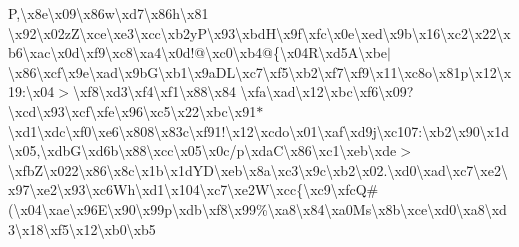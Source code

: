 \begin{DoxyCompactItemize}
P,\textbackslash{}x8e\textbackslash{}x09\textbackslash{}x86w\textbackslash{}xd7\textbackslash{}x86h\textbackslash{}x81 \textbackslash{}x92\textbackslash{}x02z\+Z\textbackslash{}xce\textbackslash{}xe3\textbackslash{}xcc\textbackslash{}xb2y\+P\textbackslash{}x93\textbackslash{}xbd\+H\textbackslash{}x9f\textbackslash{}xfc\textbackslash{}x0e\textbackslash{}xed\textbackslash{}x9b\textbackslash{}x16\textbackslash{}xc2\textbackslash{}x22\textbackslash{}xb6\textbackslash{}xac\textbackslash{}x0d\textbackslash{}xf9\textbackslash{}xc8\textbackslash{}xa4\textbackslash{}x0d!@\textbackslash{}xc0\textbackslash{}xb4@\{\textbackslash{}x04\+R\textbackslash{}xd5\+A\textbackslash{}xbe$\vert$\textbackslash{}x86\textbackslash{}xcf\textbackslash{}x9e\textbackslash{}xad\textbackslash{}x9b\+G\textbackslash{}xb1\textbackslash{}x9a\+D\+L\textbackslash{}xc7\textbackslash{}xf5\textbackslash{}xb2\textbackslash{}xf7\textbackslash{}xf9\textbackslash{}x11\textbackslash{}xc8o\textbackslash{}x81p\textbackslash{}x12\textbackslash{}x19\+:\textbackslash{}x04$>$\textbackslash{}xf8\textbackslash{}xd3\textbackslash{}xf4\textbackslash{}xf1\textbackslash{}x88\textbackslash{}x84 \textbackslash{}xfa\textbackslash{}xad\textbackslash{}x12\textbackslash{}xbc\textbackslash{}xf6\textbackslash{}x09?\textbackslash{}xcd\textbackslash{}x93\textbackslash{}xcf\textbackslash{}xfe\textbackslash{}x96\textbackslash{}xc5\textbackslash{}x22\textbackslash{}xbc\textbackslash{}x91$\ast$\textbackslash{}xd1\textbackslash{}xdc\textbackslash{}xf0\textbackslash{}xe6\textbackslash{}x808\textbackslash{}x83c\textbackslash{}xf91!\textbackslash{}x12\textbackslash{}xcdo\textbackslash{}x01\textbackslash{}xaf\textbackslash{}xd9j\textbackslash{}xc107\+:\textbackslash{}xb2\textbackslash{}x90\textbackslash{}x1d\textbackslash{}x05,\textbackslash{}xdb\+G\textbackslash{}xd6b\textbackslash{}x88\textbackslash{}xcc\textbackslash{}x05\textbackslash{}x0c/p\textbackslash{}xda\+C\textbackslash{}x86\textbackslash{}xc1\textbackslash{}xeb\textbackslash{}xde$>$\textbackslash{}xfb\+Z\textbackslash{}x022\textbackslash{}x86\textbackslash{}x8c\textbackslash{}x1b\textbackslash{}x1d\+Y\+D\textbackslash{}xeb\textbackslash{}x8a\textbackslash{}xc3\textbackslash{}x9c\textbackslash{}xb2\textbackslash{}x02.\textbackslash{}xd0\textbackslash{}xad\textbackslash{}xc7\textbackslash{}xe2\textbackslash{}x97\textbackslash{}xe2\textbackslash{}x93\textbackslash{}xc6\+Wh\textbackslash{}xd1\textbackslash{}x104\textbackslash{}xc7\textbackslash{}xe2\+W\textbackslash{}xcc\{\textbackslash{}xc9\textbackslash{}xfc\+Q\#(\textbackslash{}x04\textbackslash{}xae\textbackslash{}x96\+E\textbackslash{}x90\textbackslash{}x99p\textbackslash{}xdb\textbackslash{}xf8\textbackslash{}x99\%\textbackslash{}xa8\textbackslash{}x84\textbackslash{}xa0\+Ms\textbackslash{}x8b\textbackslash{}xce\textbackslash{}xd0\textbackslash{}xa8\textbackslash{}xd3\textbackslash{}x18\textbackslash{}xf5\textbackslash{}x12\textbackslash{}xb0\textbackslash{}xb5 
\end{DoxyCompactItemize}
